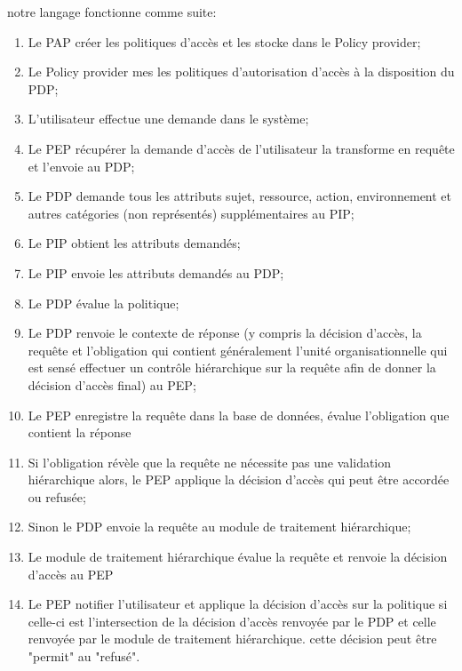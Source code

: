 \label{sectionModèle}

notre langage fonctionne comme suite:

\begin{enumerate}
\item Le PAP créer les politiques d'accès et les stocke dans le Policy provider; 
\item Le Policy provider mes les politiques d'autorisation d'accès à la disposition du PDP;
\item L'utilisateur effectue une demande dans le système;
\item Le PEP récupérer la demande d'accès de l'utilisateur la transforme en requête et l'envoie au PDP;
\item Le PDP demande tous les attributs sujet, ressource, action, environnement et autres catégories (non représentés) supplémentaires au PIP;
\item Le PIP obtient les attributs demandés;
\item Le PIP envoie les attributs demandés au PDP;
\item Le PDP évalue la politique;
\item Le PDP renvoie le contexte de réponse (y compris la décision d'accès, la requête et l'obligation qui contient généralement l'unité organisationnelle qui est sensé effectuer un contrôle hiérarchique sur la requête afin de donner la décision d'accès final) au PEP;
\item Le PEP enregistre la requête dans la base de données, évalue l'obligation que contient la réponse
\item Si l'obligation révèle que la requête ne nécessite pas une validation hiérarchique alors, le PEP applique la décision d'accès qui peut être accordée ou refusée;
\item Sinon le PDP envoie la requête au module de traitement hiérarchique; 
\item Le module de traitement hiérarchique évalue la requête et renvoie la décision d'accès au PEP
\item Le PEP notifier l'utilisateur et applique la décision d'accès sur la politique si celle-ci est l'intersection de la décision d'accès renvoyée par le PDP et celle renvoyée par le module de traitement hiérarchique. cette décision peut être "permit" au "refusé".
\end{enumerate}


